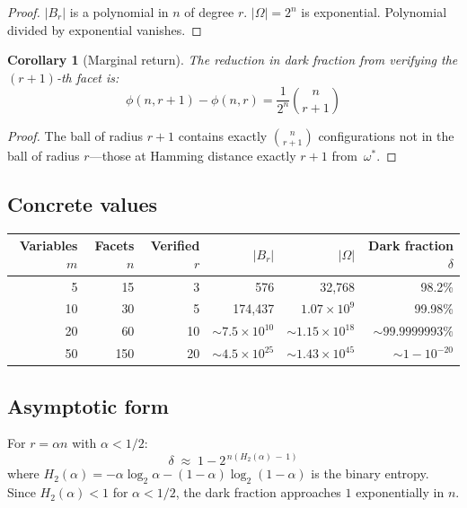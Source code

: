 \documentclass[11pt,a4paper]{article}
\newtheorem{corollary}[theorem]{Corollary}
\begin{document}
\begin{proof}
$|B_r|$ is a polynomial in $n$ of degree $r$. $|\Omega| = 2^n$ is exponential. Polynomial divided by exponential vanishes.
\end{proof}

\begin{corollary}[Marginal return]
\label{cor:marginal}
The reduction in dark fraction from verifying the $(r+1)$-th facet is:
\[
\phi(n, r+1) - \phi(n, r) = \frac{1}{2^n}\binom{n}{r+1}
\]
\end{corollary}

\begin{proof}
The ball of radius $r+1$ contains exactly $\binom{n}{r+1}$ configurations not in the ball of radius $r$---those at Hamming distance exactly $r+1$ from~$\omega^*$.
\end{proof}

\subsection{Concrete values}

\begin{center}
\begin{tabular}{@{}rrrrrr@{}}
\toprule
Variables $m$ & Facets $n$ & Verified $r$ & $|B_r|$ & $|\Omega|$ & Dark fraction $\delta$ \\
\midrule
5 & 15 & 3 & 576 & 32{,}768 & 98.2\% \\
10 & 30 & 5 & 174{,}437 & $1.07 \times 10^9$ & 99.98\% \\
20 & 60 & 10 & ${\sim}7.5 \times 10^{10}$ & ${\sim}1.15 \times 10^{18}$ & ${\sim}99.9999993\%$ \\
50 & 150 & 20 & ${\sim}4.5 \times 10^{25}$ & ${\sim}1.43 \times 10^{45}$ & ${\sim}1 - 10^{-20}$ \\
\bottomrule
\end{tabular}
\end{center}

\subsection{Asymptotic form}

For $r = \alpha n$ with $\alpha < 1/2$:
\[
\delta \;\approx\; 1 - 2^{\,n(H_2(\alpha)\,-\,1)}
\]
where $H_2(\alpha) = -\alpha\log_2\alpha - (1{-}\alpha)\log_2(1{-}\alpha)$ is the binary entropy. Since $H_2(\alpha) < 1$ for $\alpha < 1/2$, the dark fraction approaches $1$ exponentially in $n$.

\end{document}
